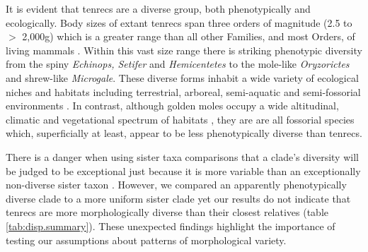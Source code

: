 \documentclass[12pt,a4paper]{article}
\begin{document}
	It is evident that tenrecs are a diverse group, both phenotypically and ecologically. Body sizes of extant tenrecs span three orders of magnitude (2.5 to $>$ 2,000g) which is a greater range than all other Families, and most Orders, of living mammals \citep{Olson2003}.%
	Within this vast size range there is striking phenotypic diversity from the spiny \textit{Echinops, Setifer} and \textit{Hemicentetes} to the mole-like \textit{Oryzorictes} and shrew-like \textit{Microgale}. These diverse forms inhabit a wide variety of ecological niches and habitats including terrestrial, arboreal, semi-aquatic and semi-fossorial environments \citep{Soarimalala2011}. 
	In contrast, although golden moles occupy a wide altitudinal, climatic and vegetational spectrum of habitats \citep{Bronner1995}, they are are all fossorial species which, superficially at least, appear to be less phenotypically diverse than tenrecs. %
	
	There is a danger when using sister taxa comparisons that a clade's diversity will be judged to be exceptional just because it is more variable than an exceptionally non-diverse sister taxon \citep{Losos2002}. However, we compared an apparently phenotypically diverse clade to a more uniform sister clade yet our results do not indicate that tenrecs are more morphologically diverse than their closest relatives (table \ref{tab:disp.summary}). These unexpected findings highlight the importance of testing our assumptions about patterns of morphological variety.
	
	
	
	
\end{document}
